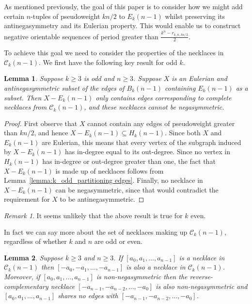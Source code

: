 \documentclass[a4paper,11pt]{article}
\theoremstyle{plain}
\newtheorem{lemma}{Lemma}[section]
\theoremstyle{definition}
\theoremstyle{remark}
\newtheorem{remark}{Remark}[section]
\begin{document}
As mentioned previously, the goal of this paper is to
consider how we might add certain $n$-tuples of pseudoweight $kn/2$ to $E_k(n-1)$ whilst preserving
its antinegasymmetry and its Eulerian property. This would enable us to construct negative
orientable sequences of period greater than $\frac{k^n-r_{k,n,kn/2}}{2}$.

To achieve this goal we need to consider the properties of the necklaces in $\mathcal{C}_k(n-1)$.
We first have the following key result for odd $k$.

\begin{lemma}  \label{lemma:complete_ciruits_odd_k}
Suppose $k\geq3$ is odd and $n\geq 3$. Suppose $X$ is an Eulerian and antinegasymmetric subset of
the edges of $B_k(n-1)$ containing $E_k(n-1)$ as a subset. Then $X-E_k(n-1)$ only contains edges
corresponding to complete necklaces from $\mathcal{C}_k(n-1)$, and these necklaces cannot be
negasymmetric.
\end{lemma}

\begin{proof}
First observe that $X$ cannot contain any edges of pseudoweight greater than $kn/2$, and hence
$X-E_k(n-1)\subseteq H_k(n-1)$.  Since both $X$ and $E_k(n-1)$ are Eulerian, this means that every
vertex of the subgraph induced by $X-E_k(n-1)$ has in-degree equal to its out-degree.  Since no
vertex in $H_k(n-1)$ has in-degree or out-degree greater than one, the fact that $X-E_k(n-1)$ is
made up of necklaces follows from Lemma~\ref{lemma:k_odd_partitioning edges}. Finally, no necklace
in $X-E_k(n-1)$ can be negasymmetric, since that would contradict the requirement for $X$ to be
antinegasymmetric.
\end{proof}

\begin{remark}
It seems unlikely that the above result is true for $k$ even.
\end{remark}

In fact we can say more about the set of necklaces making up $\mathcal{C}_k(n-1)$, regardless of
whether $k$ and $n$ are odd or even.

\begin{lemma}  \label{lemma:circuit_pairs_k_odd}
Suppose $k\geq3$ and $n\geq 3$. If $[a_0,a_1,\dots,a_{n-1}]$ is a necklace in $\mathcal{C}_k(n-1)$
then $[-a_0,-a_1,\dots,-a_{n-1}]$ is also a necklace in $\mathcal{C}_k(n-1)$. Moreover, if
$[a_0,a_1,\dots,a_{n-1}]$ is non-negasymmetric then the reverse-complementary necklace
$[-a_{n-1},-a_{n-2},\dots,-a_{0}]$ is also non-negasymmetric and $[a_0,a_1,\dots,a_{n-1}]$ shares
no edges with $[-a_{n-1},-a_{n-2},\dots,-a_{0}]$.
\end{lemma}
\end{document}
